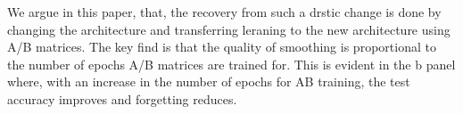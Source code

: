 We argue in this paper, that, the recovery from such a drstic change is done by changing the architecture and transferring leraning to the new architecture using A/B matrices. The key find is that the quality of smoothing is proportional to the number of epochs A/B matrices are trained for. This is evident in the b panel where, with an increase in the number of epochs for AB training, the test accuracy improves and forgetting reduces.







